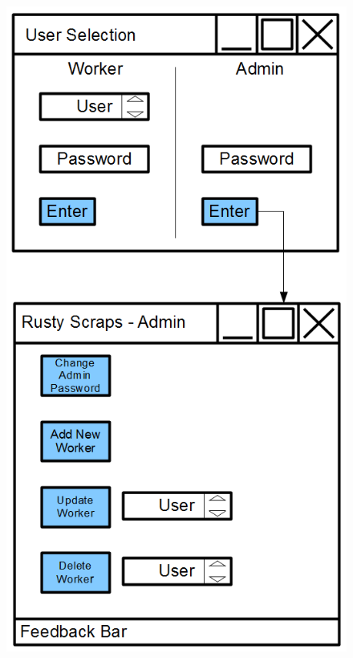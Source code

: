 \begin{figure}[H]
    \includegraphics[width=\textwidth]{./Design/Images/AdminSelect.png}
\end{figure}


